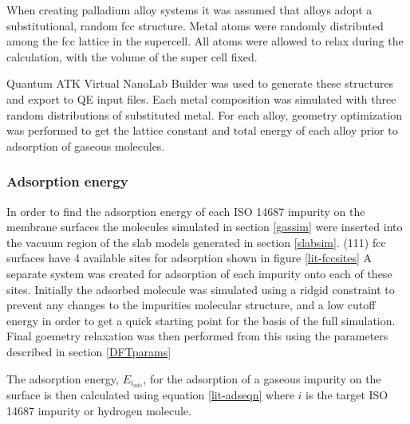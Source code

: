 When creating palladium alloy systems it was assumed that alloys adopt a substitutional, random fcc structure. Metal atoms were randomly distributed among the fcc lattice in the supercell. All atoms were allowed to relax during the calculation, with the volume of the super cell fixed. 

Quantum ATK Virtual NanoLab Builder \cite{synopsys} was used to generate these structures and export to QE input files. Each metal composition was simulated with three random distributions of substituted metal. For each alloy, geometry optimization was performed to get the lattice constant and total energy of each alloy prior to adsorption of gaseous molecules.

\subsubsection{Adsorption energy}
In order to find the adsorption energy of each ISO 14687 impurity on the membrane surfaces the molecules simulated in section \ref{gassim} were inserted into the vacuum region of the slab models generated in section \ref{slabsim}. (111) fcc surfaces have 4 available sites for adsorption shown in figure \ref{lit-fccsites} A separate system was created for adsorption of each impurity onto each of these sites. Initially the adsorbed molecule was simulated using a ridgid constraint to prevent any changes to the impurities molecular structure, and a low cutoff energy in order to get a quick starting point for the basis of the full simulation. Final goemetry relaxation was then performed from this using the parameters described in section \ref{DFTparams}

The adsorption energy, $E_{i_{ads}}$, for the adsorption of a gaseous impurity on the surface is then calculated using equation \ref{lit-adseqn} where $i$ is the target ISO 14687 impurity or hydrogen molecule.

\renewcommand{\bibname}{References}

